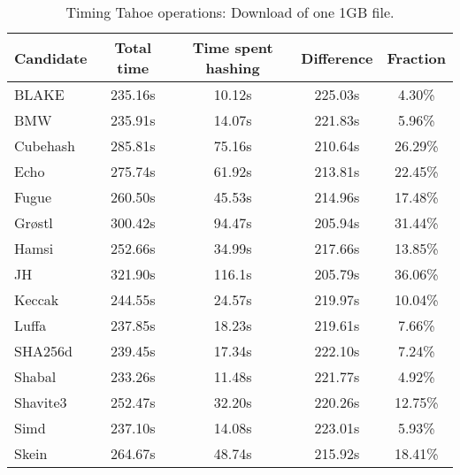 \begin{table}[h]
  \centering
  \begin{tabular}{ | l | c | c | c | c | }
    \hline
    Candidate & Total time & Time spent hashing & Difference & Fraction \\ \hline
    BLAKE     &  235.16s  &  10.12s  &  225.03s  &  4.30\%   \\  \hline
    BMW       &  235.91s  &  14.07s  &  221.83s  &  5.96\%   \\  \hline
    Cubehash  &  285.81s  &  75.16s  &  210.64s  &  26.29\%  \\  \hline
    Echo      &  275.74s  &  61.92s  &  213.81s  &  22.45\%  \\  \hline
    Fugue     &  260.50s  &  45.53s  &  214.96s  &  17.48\%  \\  \hline
    Grøstl    &  300.42s  &  94.47s  &  205.94s  &  31.44\%  \\  \hline
    Hamsi     &  252.66s  &  34.99s  &  217.66s  &  13.85\%  \\  \hline
    JH        &  321.90s  &  116.1s  &  205.79s  &  36.06\%  \\  \hline
    Keccak    &  244.55s  &  24.57s  &  219.97s  &  10.04\%  \\  \hline
    Luffa     &  237.85s  &  18.23s  &  219.61s  &  7.66\%   \\  \hline
    SHA256d   &  239.45s  &  17.34s  &  222.10s  &  7.24\%   \\  \hline
    Shabal    &  233.26s  &  11.48s  &  221.77s  &  4.92\%   \\  \hline
    Shavite3  &  252.47s  &  32.20s  &  220.26s  &  12.75\%  \\  \hline
    Simd      &  237.10s  &  14.08s  &  223.01s  &  5.93\%   \\  \hline
    Skein     &  264.67s  &  48.74s  &  215.92s  &  18.41\%  \\  \hline
  \end{tabular}
  \caption{Timing Tahoe operations: Download of one 1GB file.}
  \label{tbl:hashingtimes:get1gb}
\end{table}
